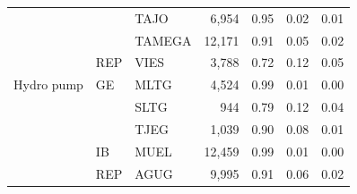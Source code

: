 \begin{tabular}{l l l r r r r}
 &  & TAJO & 6,954 & 0.95 & 0.02 & 0.01 \\
 &  & TAMEGA & 12,171 & 0.91 & 0.05 & 0.02 \\
 & REP & VIES & 3,788 & 0.72 & 0.12 & 0.05 \\
\addlinespace
Hydro pump & GE & MLTG & 4,524 & 0.99 & 0.01 & 0.00 \\
 &  & SLTG & 944 & 0.79 & 0.12 & 0.04 \\
 &  & TJEG & 1,039 & 0.90 & 0.08 & 0.01 \\
 & IB & MUEL & 12,459 & 0.99 & 0.01 & 0.00 \\
 & REP & AGUG & 9,995 & 0.91 & 0.06 & 0.02 \\
\bottomrule
\end{tabular}